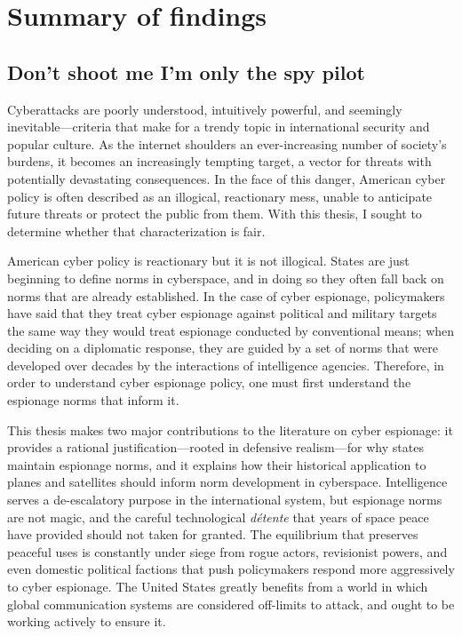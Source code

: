 \documentclass[11pt]{memoir}
\begin{document}
\section{Summary of findings}
\subsection{Don't shoot me I'm only the spy pilot}
Cyberattacks are poorly understood, intuitively powerful, and seemingly inevitable---criteria that make for a trendy topic in international security and popular culture. As the internet shoulders an ever-increasing number of society's burdens, it becomes an increasingly tempting target, a vector for threats with potentially devastating consequences. In the face of this danger, American cyber policy is often described as an illogical, reactionary mess, unable to anticipate future threats or protect the public from them. With this thesis, I sought to determine whether that characterization is fair.

American cyber policy is reactionary but it is not illogical. States are just beginning to define norms in cyberspace, and in doing so they often fall back on norms that are already established. In the case of cyber espionage, policymakers have said that they treat cyber espionage against political and military targets the same way they would treat espionage conducted by conventional means; when deciding on a diplomatic response, they are guided by a set of norms that were developed over decades by the interactions of intelligence agencies. Therefore, in order to understand cyber espionage policy, one must first understand the espionage norms that inform it.

This thesis makes two major contributions to the literature on cyber espionage: it provides a rational justification---rooted in defensive realism---for why states maintain espionage norms, and it explains how their historical application to planes and satellites should inform norm development in cyberspace. Intelligence serves a de-escalatory purpose in the international system, but espionage norms are not magic, and the careful technological \emph{d\'etente} that years of space peace have provided should not taken for granted. The equilibrium that preserves peaceful uses is constantly under siege from rogue actors, revisionist powers, and even domestic political factions that push policymakers respond more aggressively to cyber espionage. The United States greatly benefits from a world in which global communication systems are considered off-limits to attack, and ought to be working actively to ensure it.
\end{document}
